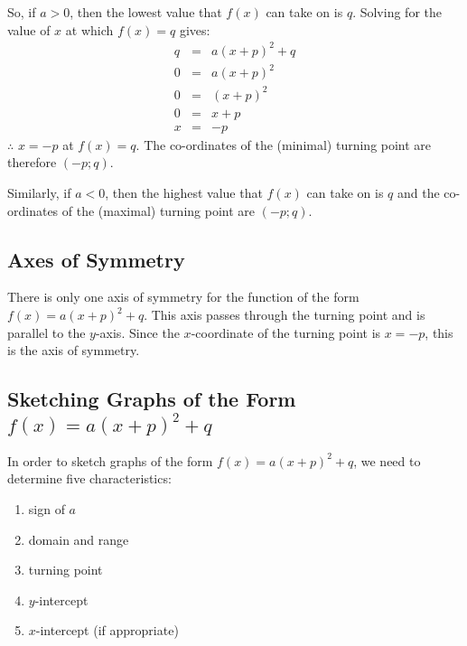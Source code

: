 So, if $a>0$, then the lowest value that $f(x)$ can take on is $q$. Solving for the value of $x$ at which $f(x)=q$ gives:
\begin{eqnarray*}
q&=&a(x+p)^2+q\\
0&=&a(x+p)^2\\
0&=&(x+p)^2\\
0&=&x+p\\
x&=&-p
\end{eqnarray*}
$\therefore$ $x=-p$ at $f(x)=q$. The co-ordinates of the (minimal) turning point are therefore $(-p;q)$.

Similarly, if $a<0$, then the highest value that $f(x)$ can take on is $q$ and the co-ordinates of the (maximal) turning point are $(-p;q)$.


\subsection{Axes of Symmetry}
There is only one axis of symmetry for the function of the form $f(x)=a(x+p)^2+q$. This axis passes through the turning point and is parallel to the $y$-axis. Since the $x$-coordinate of the turning point is $x=-p$, this is the axis of symmetry.


\subsection{Sketching Graphs of the Form $f(x)=a(x+p)^2+q$}
In order to sketch graphs of the form $f(x)=a(x+p)^2+q$, we need to determine five characteristics:
\begin{enumerate}
\item{sign of $a$}
\item{domain and range}
\item{turning point}
\item{$y$-intercept}
\item{$x$-intercept (if appropriate)}
\end{enumerate}

